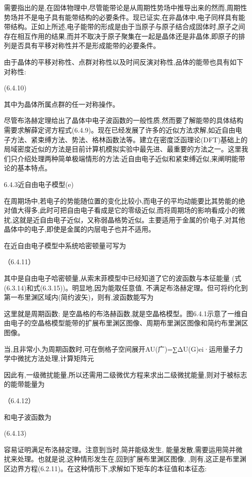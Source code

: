 需要指出的是,在固体物理中,尽管能带论是从周期性势场中推导出来的然而,周期性势场并不是电子具有能带结构的必要条件。现已证实,在非晶体中,电子同样具有能带结构。正如上所述,电子能带的形成是由于当原子与原子结合成固体时,原子之间存在相互作用的结果,而并不取决于原子聚集在一起是晶体还是非晶体,即原子的排列是否具有平移对称性并不是形成能带的必要条件。

由于晶体的平移对称性、点群对称性以及时间反演对称性,品体的能带也具有如下对称性:

	(6.4.10)

其中为晶体所属点群的任一对称操作。

尽管布洛赫定理给出了晶体中电子波函数的一般性质,然而要了解能带的具体结构需要求解薛定谔方程式(6.4.9)。现在已经发展了许多的近似方法求解,如近自由电子方法、紧束缚方法、势法、格林函数法等。建立在密度泛函理论(DFT)基础上的局域密度近似的方法是目前计算机模拟实验中最先进、最重要的方法之一。这里我们只介绍处理两种简单极端情形的方法:近自由电子近似和紧束缚近似,来阐明能带论的基本特点。

6.4.3近自由电子模型(e)

在周期场中,若电子的势能随位置的变化比较小,而电子的平均动能要比其势能的绝对值大得多,此时可把自由电子看成是它的零级近似,而将周期场的影响看成小的微扰,这就是近自由电子近似，又称弱晶格势近似。主要适用于金属的价电子,对其他晶体中的电子,即使是金属的内层电子也并不适用。

在近自由电子模型中系统哈密顿量可写为

	（6.4.11）

	其中是自由电子哈密顿量,从索末菲模型中已经知道了它的波函数与本征能量 (式(6.3.14)和式(6.3.15))。明显地,因为能取任意值, 不满足布洛赫定理。但可将约化到第一布里渊区域内(简约波矢)，则有,波函数能写为



这里就是周期函数; 是空晶格的布洛赫函数,就是空晶格模型。图6.4.1示意了一维自由电子的空晶格模型能带的扩展布里渊区图像、周期布里渊区图像和简约布里渊区图像。





当,且非常小,为周期函数时,可在倒格子空间展开AU(广)=∑ΔU(G)ei·运用量子力学中微扰方法处理,计算矩阵元



因此有,一级微扰能量,所以还需用二级微优方程来求出二级微扰能量,则对于被标志的能带能量为

	（6.4.12）

和电子波函数为

 	(6.4.13)

容易证明满足布洛赫定理。注意到当时,简并能级发生, 能量发散,需要运用简并微扰来处理。也就是说,这种情形发生在,回到扩展布里渊区图像, ,则有,这正是布里渊区边界方程(6.2.11)。在这种情形下,求解如下矩车的本征值和本征态:



